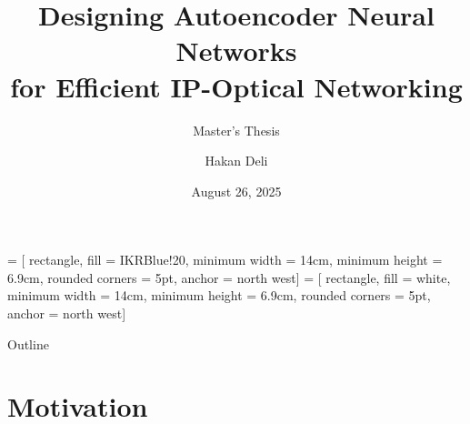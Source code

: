 \documentclass[english,aspectratio=169,dvipsnames]{beamer}
\title{Designing Autoencoder Neural Networks \\ for Efficient IP-Optical Networking}
\subtitle{Master's Thesis}
\date{August 26, 2025} %
\author{Hakan Deli}
\begin{document}
 = [  rectangle, 
                        fill = IKRBlue!20, 
                        minimum width = 14cm, 
                        minimum height = 6.9cm, 
                        rounded corners = 5pt, %
                        anchor = north west]
 = [ rectangle, 
                        fill = white, 
                        minimum width = 14cm, 
                        minimum height = 6.9cm, 
                        rounded corners = 5pt, %
                        anchor = north west]

\begin{frame}[plain]{Outline}
    \vspace{0.3cm}
    \begin{minipage}[t][1cm][t]{\linewidth}
        \setlength{\itemsep}{0cm}
        \setlength{\parskip}{3pt} 
        \tableofcontents[sectionstyle=show,subsectionstyle=show,subsubsectionstyle=hide]
    \end{minipage}
\end{frame}

\breadcrumbson

\section{Motivation}
\end{document}
